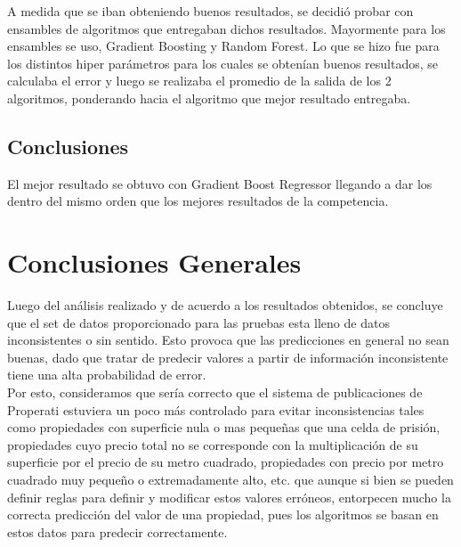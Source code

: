 \documentclass[a4paper, 10pt]{article}
\newcommand\tab[1][0.5cm]{\hspace*{#1}}
\begin{document}
		A medida que se iban obteniendo buenos resultados, se decidió probar con ensambles de algoritmos que entregaban dichos resultados. Mayormente para los ensambles se uso, Gradient Boosting y Random Forest. Lo que se hizo fue para los distintos hiper parámetros para los cuales se obtenían buenos resultados, se calculaba el error y luego se realizaba el promedio de la salida de los 2 algoritmos, ponderando hacia el algoritmo que mejor resultado entregaba. 
		
		\subsection{Conclusiones}
			El mejor resultado se obtuvo con Gradient Boost Regressor llegando a dar los dentro del mismo orden que los mejores resultados de la competencia.

		\section{Conclusiones Generales}
		
			Luego del análisis realizado y de acuerdo a los resultados obtenidos, se concluye que el set de datos proporcionado para las 
			pruebas esta lleno de datos inconsistentes o sin sentido. Esto provoca que las predicciones en general no sean buenas, dado que
			tratar de predecir valores a partir de información inconsistente tiene una alta probabilidad de error. \\
			\tab Por esto, consideramos que sería correcto que el sistema de publicaciones de Properati estuviera un poco más controlado para
			evitar inconsistencias tales como propiedades con superficie nula o mas pequeñas que una celda de prisión, propiedades cuyo precio
			total no se corresponde con la multiplicación de su superficie por el precio de su metro cuadrado, propiedades con precio por
			metro cuadrado muy pequeño o extremadamente alto, etc. que aunque si bien se pueden definir reglas para definir y modificar estos
			valores erróneos, entorpecen mucho la correcta predicción del valor de una propiedad, pues los algoritmos se basan en estos
			datos para predecir correctamente.
			
\end{document}
